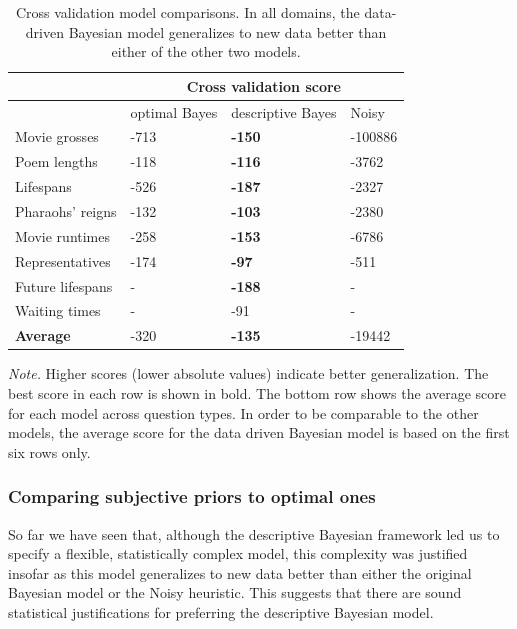 \begin{table}
\centering
\begin{threeparttable}
    \caption{Cross validation model comparisons. In all domains, the data-driven Bayesian model generalizes to new data better than either of the other two models.}
    \begin{tabular}{llll}
      \toprule
		& \multicolumn{3}{c}{Cross validation score}\\
		\midrule
		 & optimal Bayes & descriptive Bayes  & Noisy \mink \\
      \midrule
        Movie grosses & -713 & \textbf{-150} & -100886\\
		Poem lengths & -118 & \textbf{-116} & -3762\\
		Lifespans & -526 & \textbf{-187} & -2327\\
		Pharaohs' reigns & -132 & \textbf{-103} & -2380\\
		Movie runtimes & -258 & \textbf{-153} & -6786\\
		Representatives & -174 & \textbf{-97} & -511\\
		Future lifespans & - & \textbf{-188} & - \\
		Waiting times & - & -91 & - \\
		\textbf{Average} & -320 & \textbf{-135} & -19442\\
      \midrule
    \end{tabular}
    \begin{tablenotes}
      \small
      \item \textit{Note.} Higher scores (lower absolute values) indicate better generalization. The best score in each row is shown in bold. The bottom row shows the average score for each model across question types. In order to be comparable to the other models, the average score for the data driven Bayesian model is based on the first six rows only.
    \end{tablenotes}
\label{tbl:cross_validation}
\end{threeparttable}
\end{table}

\bigskip
\subsubsection*{Comparing subjective priors to optimal ones}

So far we have seen that, although the descriptive Bayesian framework led us to specify a flexible, statistically complex model, this complexity was justified insofar as this model generalizes to new data better than either the original Bayesian model or the Noisy \mink heuristic. This suggests that there are sound statistical justifications for preferring the descriptive Bayesian model. 

